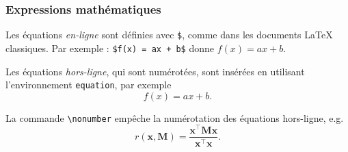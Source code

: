 \documentclass[10pt,    %
    french,             %
    xcolor=table,       %
    envcountsect,       %
    aspectratio=43      %
]{beamer}
\begin{document}
\begin{frame}
    \frametitle{Expressions mathématiques}
    
    Les équations \textit{en-ligne} sont définies avec \texttt{\$}, comme dans les documents \LaTeX{} classiques. Par exemple : \texttt{\$f(x) = ax + b\$} donne $f(x)=ax + b$.
    
    \medskip
    Les équations \textit{hors-ligne}, qui sont numérotées, sont insérées en utilisant l'environnement \texttt{equation}, par exemple
    \begin{equation}
        \label{equ:affine}
        f(x) = ax + b.
    \end{equation}
    
    La commande \texttt{\textbackslash{}nonumber} empêche la numérotation des équations hors-ligne, e.g.
    \begin{equation}
        \label{equ:rayleigh}
        r(\mathbf{x},\mathbf{M}) = \frac{\mathbf{x}^\top \mathbf{M} \mathbf{x}}{\mathbf{x}^\top \mathbf{x}}. \nonumber
    \end{equation}
    
    
    
    
    
    
\end{frame}




\end{document}
